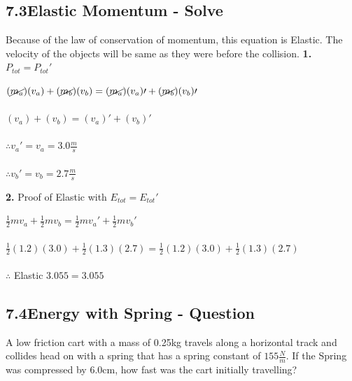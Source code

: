 \documentclass{article}
\begin{document}
\begin{adjustwidth}{1cm}{0pt}
    \subsection*{7.3\hspace*{0.5cm}Elastic Momentum - Solve}
    Because of the law of conservation of momentum, this equation is Elastic. The velocity of the objects will be same as they were before the collision.\newline\newline
    \textbf{1.} $P_{tot} = P_{tot}\prime$ \\
    \begin{adjustwidth}{0.6cm}{0pt}
        $(\cancel{m_{a}})({v}_{a}) + (\cancel{m_{b}})({v}_{b}) = (\cancel{m_{a}})({v}_{a})\prime + (\cancel{m_{b}})({v}_{b})\prime$ \\\\
        $({v}_{a}) + ({v}_{b}) = ({v}_{a})\prime + ({v}_{b})\prime$ \\\\
        $\therefore v_{a}\prime = v_{a} = 3.0\frac{m}{s}$ \\\\
        $\therefore v_{b}\prime = v_{b} = 2.7\frac{m}{s}$
    \end{adjustwidth}\vspace*{15pt}
    \textbf{2.} Proof of Elastic with $E_{tot} = E_{tot}\prime$ \\
    \begin{adjustwidth}{0.6cm}{0pt}
        $\frac{1}{2}mv_{a} + \frac{1}{2}mv_{b} = \frac{1}{2}mv_{a}\prime + \frac{1}{2}mv_{b}\prime$ \\\\
        $\frac{1}{2}(1.2)(3.0) + \frac{1}{2}(1.3)(2.7) = \frac{1}{2}(1.2)(3.0) + \frac{1}{2}(1.3)(2.7)$ \\\\
        $\therefore$ Elastic $3.055 = 3.055$
    \end{adjustwidth}\vspace*{15pt}

    \subsection*{7.4\hspace*{0.5cm}Energy with Spring - Question}
    A low friction cart with a mass of 0.25kg travels along a horizontal track and collides
    head on with a spring that has a spring constant of $155\frac{N}{m}$.
    If the Spring was compressed by 6.0cm, how fast was the cart initially travelling?

\end{adjustwidth}
\end{document}
